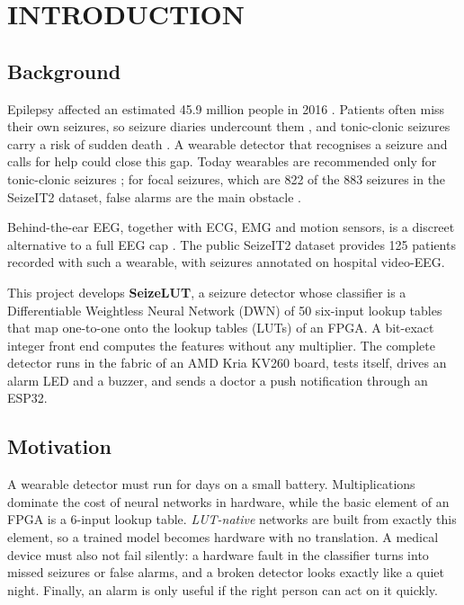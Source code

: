 \chapter{INTRODUCTION}\label{ch:intro}

\section{Background}

Epilepsy affected an estimated 45.9 million people in 2016 \cite{gbd2019epilepsy}. Patients often miss their own
seizures, so seizure diaries undercount them \cite{elger2018underreporting}, and tonic-clonic seizures carry a risk of
sudden death \cite{ryvlin2013mortemus}. A wearable detector that recognises a seizure and calls for help could close
this gap. Today wearables are recommended only for tonic-clonic seizures \cite{beniczky2021guideline}; for focal
seizures, which are 822 of the 883 seizures in the SeizeIT2 dataset, false alarms are the main obstacle
\cite{swinnen2026seizeit2}.

Behind-the-ear EEG, together with ECG, EMG and motion sensors, is a discreet alternative to a full EEG cap
\cite{vandecasteele2020bte,vandecasteele2021ecg}. The public SeizeIT2 dataset \cite{bhagubai2025seizeit2} provides
125 patients recorded with such a wearable, with seizures annotated on hospital video-EEG.

This project develops \textbf{SeizeLUT}, a seizure detector whose classifier is a Differentiable Weightless Neural
Network (DWN) \cite{bacellar2024dwn} of 50 six-input lookup tables that map one-to-one onto the lookup tables (LUTs)
of an FPGA. A bit-exact integer front end computes the features without any multiplier. The complete detector runs in
the fabric of an AMD Kria KV260 board, tests itself, drives an alarm LED and a buzzer, and sends a doctor a push
notification through an ESP32.

\section{Motivation}

A wearable detector must run for days on a small battery. Multiplications dominate the cost of neural networks in
hardware, while the basic element of an FPGA is a 6-input lookup table. \emph{LUT-native} networks
\cite{bacellar2024dwn,petersen2022dlgn,umuroglu2020logicnets} are built from exactly this element, so a trained model
becomes hardware with no translation. A medical device must also not fail silently: a hardware fault in the classifier
turns into missed seizures or false alarms, and a broken detector looks exactly like a quiet night. Finally, an alarm
is only useful if the right person can act on it quickly.

